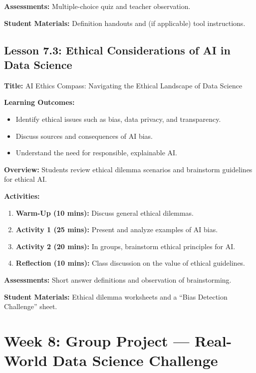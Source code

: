 \documentclass{tufte-book}
\begin{document}
\medskip
\textbf{Assessments:}  
Multiple-choice quiz and teacher observation.

\medskip
\textbf{Student Materials:}  
Definition handouts and (if applicable) tool instructions.

\subsection{Lesson 7.3: Ethical Considerations of AI in Data Science}
\textbf{Title:} AI Ethics Compass: Navigating the Ethical Landscape of Data Science

\medskip
\textbf{Learning Outcomes:}
\begin{itemize}[leftmargin=*, label={\textbullet}]
    \item Identify ethical issues such as bias, data privacy, and transparency.
    \item Discuss sources and consequences of AI bias.
    \item Understand the need for responsible, explainable AI.
\end{itemize}

\medskip
\textbf{Overview:}  
Students review ethical dilemma scenarios and brainstorm guidelines for ethical AI.

\medskip
\textbf{Activities:}
\begin{enumerate}[label=\arabic*.]
    \item \textbf{Warm-Up (10 mins):} Discuss general ethical dilemmas.
    \item \textbf{Activity 1 (25 mins):} Present and analyze examples of AI bias.
    \item \textbf{Activity 2 (20 mins):} In groups, brainstorm ethical principles for AI.
    \item \textbf{Reflection (10 mins):} Class discussion on the value of ethical guidelines.
\end{enumerate}

\medskip
\textbf{Assessments:}  
Short answer definitions and observation of brainstorming.

\medskip
\textbf{Student Materials:}  
Ethical dilemma worksheets and a “Bias Detection Challenge” sheet.

\section{Week 8: Group Project --- Real-World Data Science Challenge}
\end{document}
